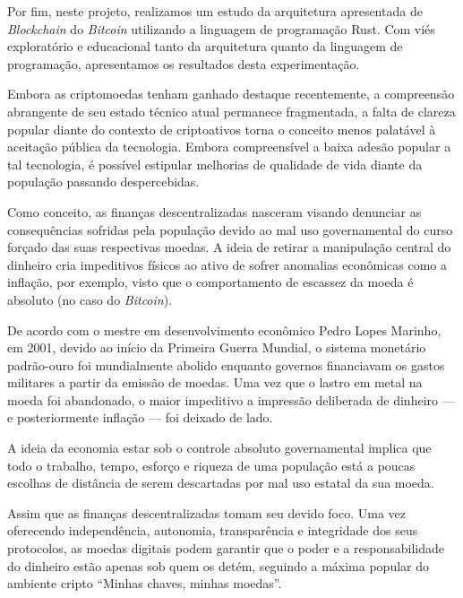 \documentclass[article,12pt,oneside,a4paper,english,brazil]{unifil}
\begin{document}
\begin{Spacing}{1.5}
Por fim, neste projeto, realizamos um estudo da arquitetura apresentada de \textit{Blockchain} do \textit{Bitcoin} utilizando a linguagem de programação Rust. Com viés exploratório e educacional tanto da arquitetura quanto da linguagem de programação, apresentamos os resultados desta experimentação.


Embora as criptomoedas tenham ganhado destaque recentemente, a compreensão abrangente de seu estado técnico atual permanece fragmentada, a falta de clareza popular diante do contexto de criptoativos torna o conceito menos palatável à aceitação pública da tecnologia. Embora compreensível a baixa adesão popular a tal tecnologia, é possível estipular melhorias de qualidade de vida diante da população passando despercebidas.

Como conceito, as finanças descentralizadas nasceram visando denunciar as consequências sofridas pela população devido ao mal uso governamental do curso forçado das suas respectivas moedas. A ideia de retirar a manipulação central do dinheiro cria impeditivos físicos ao ativo de sofrer anomalias econômicas como a inflação, por exemplo, visto que o comportamento de escassez da moeda é absoluto (no caso do \textit{Bitcoin}).

De acordo com o mestre em desenvolvimento econômico Pedro Lopes Marinho, em 2001, devido ao início da Primeira Guerra Mundial, o sistema monetário padrão-ouro foi mundialmente abolido enquanto governos financiavam os gastos militares a partir da emissão de moedas. Uma vez que o lastro em metal na moeda foi abandonado, o maior impeditivo a impressão deliberada de dinheiro — e posteriormente inflação — foi deixado de lado.

A ideia da economia estar sob o controle absoluto governamental implica que todo o trabalho, tempo, esforço e riqueza de uma população está a poucas escolhas de distância de serem descartadas por mal uso estatal da sua moeda.

Assim que as finanças descentralizadas tomam seu devido foco. Uma vez oferecendo independência, autonomia, transparência e integridade dos seus protocolos, as moedas digitais podem garantir que o poder e a responsabilidade do dinheiro estão apenas sob quem os detém, seguindo a máxima popular do ambiente cripto ``Minhas chaves, minhas moedas''.



% 


\end{Spacing}
\end{document}
